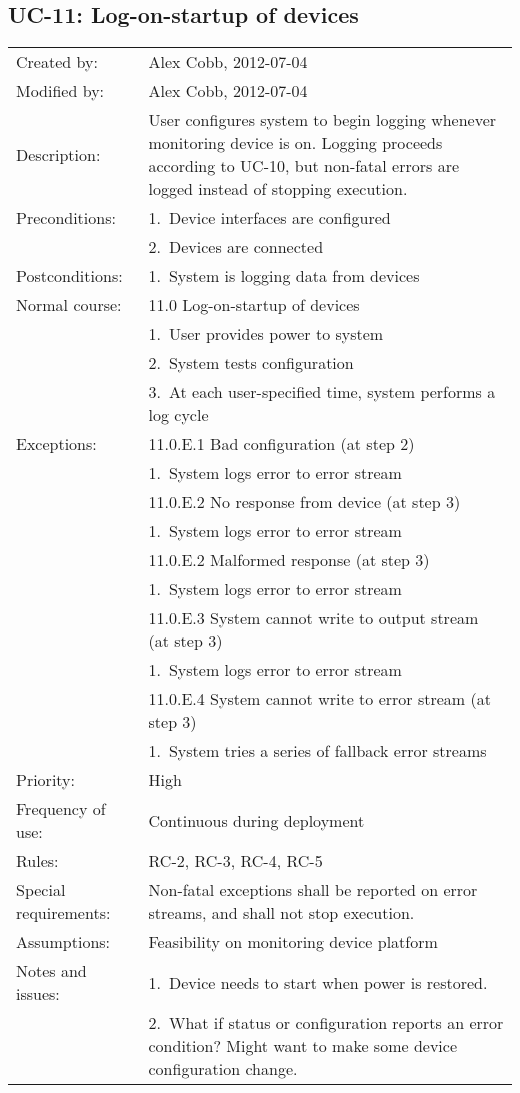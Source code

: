 \documentclass[pdftex,oneside,12pt,a4paper]{book}
\begin{document}
\subsection{UC-11: Log-on-startup of devices}
\begin{tabular}{|l|p{10cm}|}\hline
Created by: & Alex Cobb, 2012-07-04 \\
Modified by: & Alex Cobb, 2012-07-04 \\\hline
Description: & User configures system to begin logging whenever monitoring device is on. Logging proceeds according to UC-10, but non-fatal errors are logged instead of stopping execution.\\\hline
Preconditions: & 1.\ Device interfaces are configured \\
 & 2.\ Devices are connected \\\hline
Postconditions: & 1.\ System is logging data from devices \\\hline
Normal course: & 11.0 Log-on-startup of devices\\
 & 1.\ User provides power to system \\
 & 2.\ System tests configuration\\
 & 3.\ At each user-specified time, system performs a log cycle\\\hline
Exceptions: & 11.0.E.1 Bad configuration (at step 2)\\
 & 1.\ System logs error to error stream \\\cline{2-2}
 & 11.0.E.2 No response from device (at step 3) \\
 & 1.\ System logs error to error stream\\\cline{2-2}
 & 11.0.E.2 Malformed response (at step 3)\\
 & 1.\ System logs error to error stream\\\cline{2-2}
 & 11.0.E.3 System cannot write to output stream (at step 3) \\
 & 1.\ System logs error to error stream\\\cline{2-2}
 & 11.0.E.4 System cannot write to error stream (at step 3)\\
 & 1.\ System tries a series of fallback error streams\\\hline
Priority: & High \\\hline
Frequency of use: & Continuous during deployment\\\hline
Rules: & RC-2, RC-3, RC-4, RC-5\\\hline
Special requirements: & Non-fatal exceptions shall be reported on error streams, and shall not stop execution.\\\hline
Assumptions: & Feasibility on monitoring device platform\\\hline
Notes and issues: & 1.\ Device needs to start when power is restored.\\
 & 2.\ What if status or configuration reports an error condition? Might want to make some device configuration change.\\\hline
\end{tabular}
\end{document}
